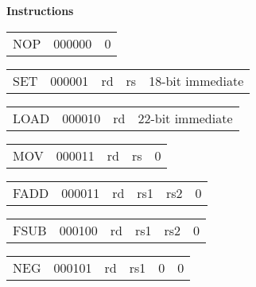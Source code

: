 \documentclass{article}
\begin{document}
\begin{minipage}[t]{0.3\textwidth}
	\begin{center}
		\textbf{Instructions}
	\end{center}
\end{minipage}
\begin{minipage}[t]{110mm}
	\begin{tabular}{p{12mm}|C{15mm}|C{75.15mm}|}
		NOP & 000000 & 0 \\ 
	\end{tabular} 
	
	\medskip

	\begin{tabular}{p{12mm}|C{15mm}|C{10mm}|C{10mm}|C{55.15mm}|}
		SET & 000001 & rd & rs & 18-bit immediate \\
	\end{tabular}

	\medskip
	
	\begin{tabular}{p{12mm}|C{15mm}|C{10mm}|C{65.3mm}|}
		LOAD & 000010 & rd & 22-bit immediate \\
	\end{tabular}

	\medskip

	\begin{tabular}{p{12mm}|C{15mm}|C{10mm}|C{10mm}|C{55.15mm}|}
		MOV & 000011 & rd & rs & 0  \\
	\end{tabular}

	\medskip

	\begin{tabular}{p{12mm}|C{15mm}|C{10mm}|C{10mm}|C{10mm}|C{45mm}|}
		FADD & 000011 & rd & rs1 & rs2 & 0 \\
	\end{tabular}

	\medskip

	\begin{tabular}{p{12mm}|C{15mm}|C{10mm}|C{10mm}|C{10mm}|C{45mm}|}
		FSUB & 000100 & rd & rs1 & rs2 & 0 \\
	\end{tabular}

	\medskip

	\begin{tabular}{p{12mm}|C{15mm}|C{10mm}|C{10mm}|C{10mm}|C{45mm}|}
		NEG & 000101 & rd & rs1 & 0 & 0 \\
	\end{tabular}


\end{minipage}
\end{document}
